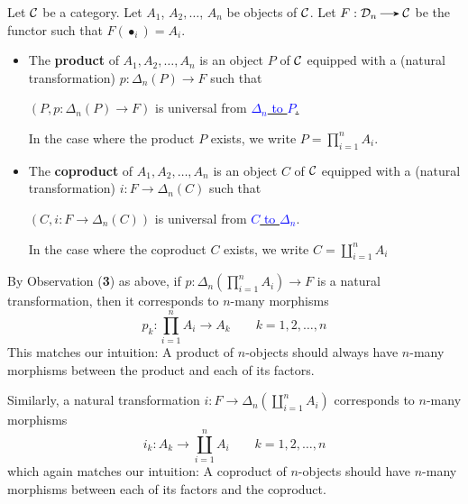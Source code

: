     \begin{definition}\label{definition:finite_products_and_coproducts}
    Let $\mathcal{C}$ be a category. Let $A_1$, $A_2, \dots$, $A_n$ be objects of $\mathcal{C}$. Let 
    $F: \mathcal{D}_n \to \cc$ be the functor such that $F(\bullet_i) = A_i$.
    
    \begin{itemize}
        \item The \textbf{product} of $A_1, A_2, \dots, A_n$ 
        is an object $P$ of $\mathcal{C}$ equipped with
        a (natural transformation) $ \displaystyle p: \Delta_n\left( P \right) \to F$ 
        such that 
        \begin{center}
            $\displaystyle \left( P, p: \Delta_n\left( P \right) \to F \right)$
            is universal from 
            \hyperref[definition:universal_morphism_from_D_to_F]{\textcolor{blue}{$\Delta_n$ to $P$}.}
        \end{center}
        In the case where the product $P$ exists, we write $P = \prod_{i = 1}^{n} A_i$. 

        \item The \textbf{coproduct} of $A_1, A_2, \dots, A_n$
        is an object $C$ of $\mathcal{C}$ equipped with 
        a (natural transformation) $i: F \to \Delta_n(C)$ such that 
            \begin{center}
                $(C, i: F \to \Delta_n(C))$ is universal from \hyperref[definition:universal_morphism_from_F_to_D]{\textcolor{blue}{$C$ to $\Delta_n$}}.
            \end{center}
        In the case where the coproduct $C$ exists, we write $C = \coprod_{i = 1}^{n} A_i$ 
        \end{itemize}

    \end{definition}
    \begin{remark}
        By Observation (\textbf{3}) as above, if $\displaystyle p: \Delta_n\left( \prod_{i=1}^{n}A_i \right) \to F$
        is a natural transformation, then it corresponds to $n$-many morphisms 
        \[
            p_k: \prod_{i=1}^{n}A_i \to A_k \qquad k = 1, 2, \dots, n
        \]
        This matches our intuition: A product of $n$-objects should always have 
        $n$-many morphisms between the product and each of its factors. 

        Similarly, a natural transformation $i: F \to \Delta_n\left( \coprod_{i = 1}^{n}A_i \right)$ corresponds to 
        $n$-many morphisms 
        \[
            i_k: A_k \to \coprod_{i = 1}^{n}A_i \qquad k = 1, 2, \dots, n
        \]
        which again matches our intuition: A coproduct of $n$-objects should have 
        $n$-many morphisms between each of its factors and the coproduct.
    \end{remark}
    
